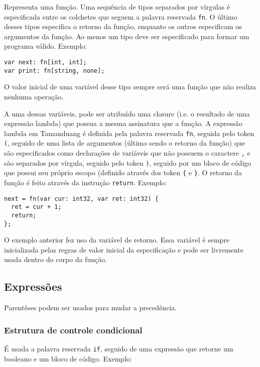 \documentclass[12pt, a4paper]{article}
\begin{document}
Representa uma função. Uma sequência de tipos separados por vírgulas é
especificada entre os colchetes que seguem a palavra reservada \texttt{fn}. O
último desses tipos especifica o retorno da função, enquanto os outros
especificam os argumentos da função. Ao menos um tipo deve ser especificado para
formar um programa válido. Exemplo:

\begin{verbatim}
var next: fn[int, int];
var print: fn[string, none];
\end{verbatim}

O valor inicial de uma variável desse tipo sempre será uma função que não
realiza nenhuma operação.

A uma dessas variáveis, pode ser atribuído uma closure (i.e. o resultado de uma
expressão lambda) que possua a mesma assinatura que a função. A expressão lambda
em Tamanduang é definida pela palavra reservada \texttt{fn}, seguida pelo token
\texttt{(}, seguido de uma lista de argumentos (último sendo o retorno da
função) que são especificados como declarações de variáveis que não possuem o
caractere \texttt{,} e são separados por vírgula, seguido pelo token \texttt{)},
seguido por um bloco de código que possui seu próprio escopo (definido através
dos token \texttt{\{} e \texttt{\}}. O retorno da função é feito através da
instrução \texttt{return}. Exemplo:

\begin{verbatim}
next = fn(var cur: int32, var ret: int32) {
  ret = cur + 1;
  return;
};
\end{verbatim}

O exemplo anterior fez uso da variável de retorno. Essa variável é sempre
inicializada pelas regras de valor inicial da especificação e pode ser
livremente usada dentro do corpo da função.

\subsection{Expressões}

Parentêses podem ser usados para mudar a precedência.

\subsubsection{Estrutura de controle condicional}

É usada a palavra reservada \texttt{if}, seguido de uma expressão que retorne um
booleano e um bloco de código. Exemplo:
\end{document}
